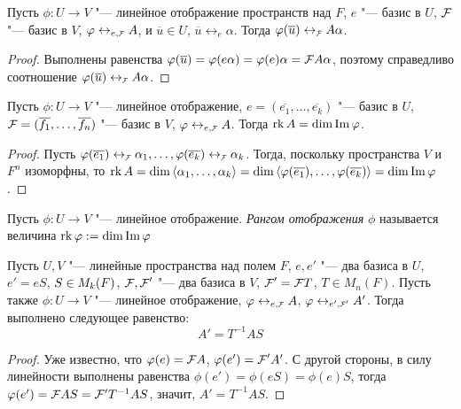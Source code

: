 \begin{proposition}
	Пусть $\phi: U \rightarrow V$ "--- линейное отображение пространств над $F$, $e$ "--- базис в $U$, $\FF$ "--- базис в $V$, $\phi \leftrightarrow_{e, \FFF} A$, и $\overline{u} \in U$, $\overline{u} \leftrightarrow_{e} \alpha$. Тогда $\phi(\overline{u}) \leftrightarrow_{\FFF} A\alpha$.
\end{proposition}

\begin{proof}
	Выполнены равенства $\phi(\overline{u}) = \phi(e\alpha) = \phi(e)\alpha = \FF 	A\alpha$, поэтому справедливо соотношение $\phi(\overline{u}) \leftrightarrow_{\FFF} A\alpha$.
\end{proof}

\begin{proposition}
	Пусть $\phi: U \rightarrow V$ "--- линейное отображение, $e = (\overline{e_1}, \dots, \overline{e_k})$ "--- базис в $U$, $\FF  = (\overline{f_1}, \dots, \overline{f_n})$ "--- базис в $V$, $\phi \leftrightarrow_{e, \FFF} A$. Тогда $\operatorname{rk}{A} = \dim{\operatorname{Im}{\ensuremath{\varphi}}}$.
\end{proposition}

\begin{proof}
	Пусть $\phi(\overline{e_1}) \leftrightarrow_{\FFF} \alpha_1, \dotsc, \phi(\overline{e_k}) \leftrightarrow_{\FFF} \alpha_k$. Тогда, поскольку пространства $V$ и $F^n$ изоморфны, то $\rk{A} \hm{=} \dim{\langle \alpha_1, \dots, \alpha_k\rangle} = \dim{\langle \phi(\overline{e_1}), \dots, \phi(\overline{e_k})\rangle} = \dim{\im{\phi}}$.
\end{proof}

\begin{definition}
	Пусть $\phi: U \rightarrow V$ "--- линейное отображение. \textit{Рангом отображения} $\phi$ называется величина $\operatorname{rk}\varphi := \dim{\operatorname{Im}{\ensuremath{\varphi}}}$
\end{definition}

\begin{proposition}
	Пусть $U, V$ "--- линейные пространства над полем $F$, $e, e'$ "--- два базиса в $U$, $e' = eS$, $S \hm{\in} M_{k}(F)$, $\FF , \FF '$ "--- два базиса в $V$, $\FF ' = \FF T$, $T \in M_{n}(F)$. Пусть также $\phi: U \rightarrow V$ "--- линейное отображение, $\phi \leftrightarrow_{e, \FFF} A$, $\phi \leftrightarrow_{e', \FFF'}{} A'$. Тогда выполнено следующее равенство:
	\[A' = T^{-1}AS\]
\end{proposition}

\begin{proof}
	Уже известно, что $\phi(e) = \FF A$, $\phi(e') = \FF 'A'$. С другой стороны, в силу линейности выполнены равенства $\phi(e') = \phi(eS) = \phi(e)S$, тогда $\phi({e'}) = \FF AS = \mathcal{F'}T^{-1}AS$, значит, $A' = T^{-1}AS$.
\end{proof}


